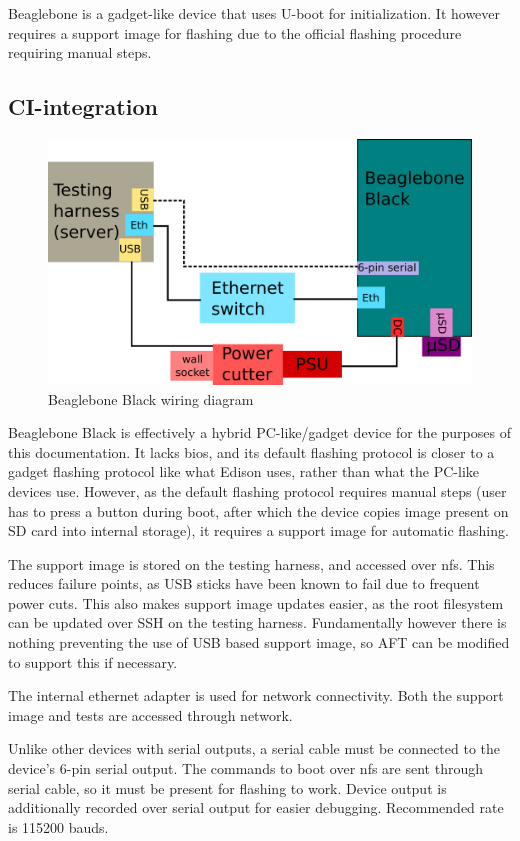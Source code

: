 \documentclass[a4paper,11pt]{article}
\begin{document}
Beaglebone is a gadget-like device that uses U-boot for initialization. It however requires a support image for flashing due to the official flashing procedure requiring manual steps.

\subsection{CI-integration}

\begin{figure}[h]
	\centering
	\includegraphics[width=0.7\linewidth]{beaglebonewiring.png}
	\caption{Beaglebone Black wiring diagram}
	\label{fig:minnowwiring}
\end{figure}

Beaglebone Black is effectively a hybrid PC-like/gadget device for the purposes of this documentation. It lacks bios, and its default flashing protocol is closer to a gadget flashing protocol like what Edison uses, rather than what the PC-like devices use. However, as the default flashing protocol requires manual steps (user has to press a button during boot, after which the device copies image present on SD card into internal storage), it requires a support image for automatic flashing.

The support image is stored on the testing harness, and accessed over nfs. This reduces failure points, as USB sticks have been known to fail due to frequent power cuts. This also makes support image updates easier, as the root filesystem can be updated over SSH on the testing harness. Fundamentally however there is nothing preventing the use of USB based support image, so AFT can be modified to support this if necessary.

The internal ethernet adapter is used for network connectivity. Both the support image and tests are accessed through network.

Unlike other devices with serial outputs, a serial cable must be connected to the device's 6-pin serial output. The commands to boot over nfs are sent through serial cable, so it must be present for flashing to work. Device output is additionally recorded over serial output for easier debugging. Recommended rate is 115200 bauds.
\end{document}
